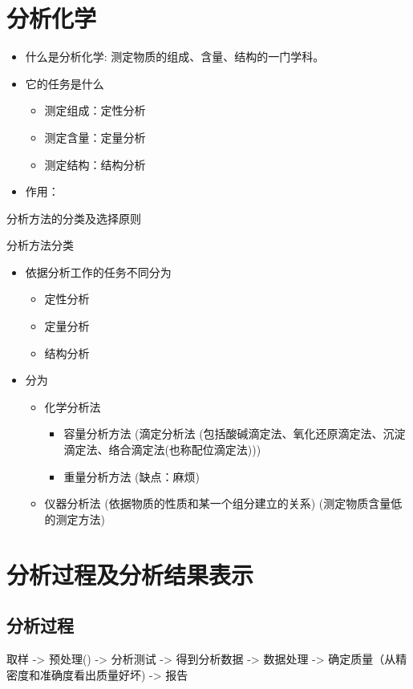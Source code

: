 \section{分析化学}

\begin{itemize}
	\item 什么是分析化学: 测定物质的组成、含量、结构的一门学科。
	\item 它的任务是什么

	\begin{itemize}
		\item 测定组成：定性分析
		\item 测定含量：定量分析
		\item 测定结构：结构分析	
	\end{itemize}

	\item 作用： 
	
\end{itemize}

分析方法的分类及选择原则

分析方法分类
\begin{itemize}
	\item 依据分析工作的任务不同分为
	\begin{itemize}
		\item 定性分析
		\item 定量分析
		\item 结构分析
	\end{itemize}
		
	\item 分为
	\begin{itemize}
		\item 化学分析法
		\begin{itemize}
			\item 容量分析方法 (滴定分析法 (包括酸碱滴定法、氧化还原滴定法、沉淀滴定法、络合滴定法(也称配位滴定法))) 
			\item 重量分析方法 (缺点：麻烦)
				
		\end{itemize}
		\item 仪器分析法 (依据物质的性质和某一个组分建立的关系) (测定物质含量低的测定方法)

	\end{itemize}
\end{itemize}
\section{分析过程及分析结果表示}
\subsection{分析过程}
取样 -> 预处理() -> 分析测试 -> 得到分析数据 -> 数据处理 -> 确定质量（从精密度和准确度看出质量好坏) -> 报告

